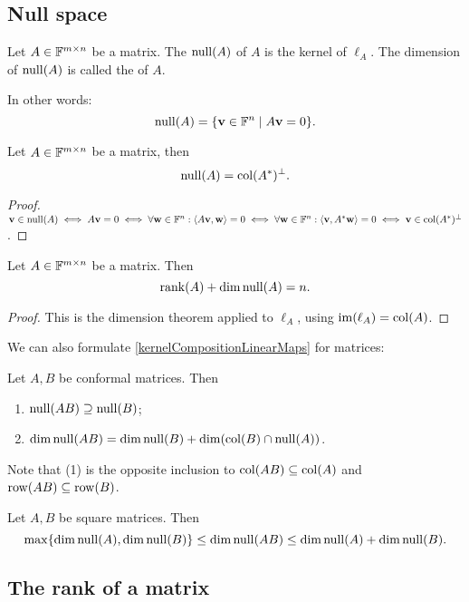 \subsection{Null space}
\begin{definition}
Let $A\in \mathbb{F}^{m\times n}$ be a matrix. The  $\operatorname{null}(A)$ of $A$ is the kernel of $\ell_A$. The dimension of $\operatorname{null}(A)$ is called the  of $A$.
\end{definition}
In other words:
\[ \Null(A) = \setbuilder{\vec{v}\in \F^n}{A\vec{v} = 0}. \]

\begin{proposition}
Let $A\in\mathbb{F}^{m\times n}$ be a matrix, then
\[ \operatorname{null}(A) = \operatorname{col}(A^*)^\perp. \]
\end{proposition}
\begin{proof}
$\vec{v}\in\Null(A) \iff A\vec{v} = 0 \iff \forall \vec{w}\in\F^n:\inner{A\vec{v},\vec{w}}=0 \iff \forall \vec{w}\in\F^n: \inner{\vec{v},A^*\vec{w}}=0 \iff \vec{v}\in\Col(A^*)^\perp$.
\end{proof}

\begin{lemma} \label{dimensionTheoremMatrices}
Let $A\in \mathbb{F}^{m\times n}$ be a matrix. Then
\[ \operatorname{rank}(A) + \dim\operatorname{null}(A) = n. \]
\end{lemma}
\begin{proof}
This is the dimension theorem applied to $\ell_A$, using $\operatorname{im}(\ell_A) = \operatorname{col}(A)$.
\end{proof}

We can also formulate \ref{kernelCompositionLinearMaps} for matrices:
\begin{proposition} \label{nullSpaceProduct}
Let $A,B$ be conformal matrices. Then
\begin{enumerate}
\item $\operatorname{null}(AB)\supseteq \operatorname{null}(B)$;
\item $\dim\operatorname{null}(AB) = \dim\operatorname{null}(B) + \dim(\operatorname{col}(B)\cap\operatorname{null}(A))$.
\end{enumerate}
\end{proposition}
Note that (1) is the opposite inclusion to $\operatorname{col}(AB)\subseteq \operatorname{col}(A)$ and $\operatorname{row}(AB)\subseteq \operatorname{row}(B)$.
\begin{corollary}
Let $A,B$ be square matrices. Then
\[ \max\{\dim\operatorname{null}(A),\dim\operatorname{null}(B)\} \leq \dim\operatorname{null}(AB) \leq \dim\operatorname{null}(A) + \dim\operatorname{null}(B). \]
\end{corollary}

\subsection{The rank of a matrix}
